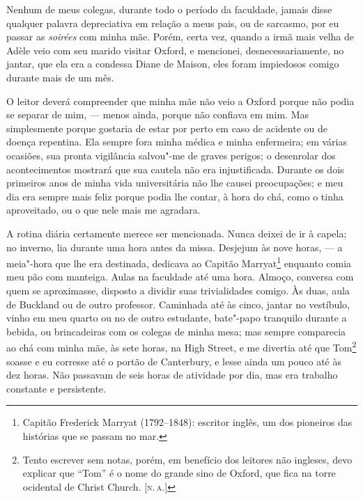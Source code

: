 Nenhum de meus colegas, durante todo o período da faculdade, jamais
disse qualquer palavra depreciativa em relação a meus pais, ou de
sarcasmo, por eu passar as \textit{soirées} com minha mãe. Porém, certa
vez, quando a irmã mais velha de Adèle veio com seu marido visitar
Oxford, e mencionei, desnecessariamente, no jantar, que ela era a
condessa Diane de Maison, eles foram impiedosos comigo durante mais de
um mês.

O leitor deverá compreender que minha mãe não veio a Oxford porque não
podia se separar de mim, --- menos ainda, porque não confiava em mim. Mas
simplesmente porque gostaria de estar por perto em caso de acidente ou
de doença repentina. Ela sempre fora minha médica e minha enfermeira; em
várias ocasiões, sua pronta vigilância salvou"-me de graves perigos; o
desenrolar dos acontecimentos mostrará que sua cautela não era
injustificada. Durante os dois primeiros anos de minha vida
universitária não lhe causei preocupações; e meu dia era sempre mais
feliz porque podia lhe contar, à hora do chá, como o tinha aproveitado,
ou o que nele mais me agradara.

A rotina diária certamente merece ser mencionada. Nunca deixei de
ir à capela; no inverno, lia durante uma hora antes da missa. Desjejum
às nove horas, --- a meia"-hora que lhe era destinada, dedicava ao Capitão
Marryat\footnote{Capitão Frederick Marryat (1792--1848): escritor inglês,
  um dos pioneiros das histórias que se passam no mar.}
enquanto comia meu pão com manteiga. Aulas na faculdade até uma hora.
Almoço, conversa com quem se aproximasse, disposto a dividir suas
trivialidades comigo. Às duas, aula de Buckland ou de outro professor.
Caminhada até às cinco, jantar no vestíbulo, vinho em meu quarto ou no
de outro estudante, bate"-papo tranquilo durante a bebida, ou
brincadeiras com os colegas de minha mesa; mas sempre comparecia ao chá
com minha mãe, às sete horas, na High Street, e me divertia até que
Tom\footnote{Tento escrever sem notas, porém, em benefício dos leitores
  não ingleses, devo explicar que ``Tom'' é o nome do grande sino de
  Oxford, que fica na torre ocidental de Christ Church. {[}\textsc{n.\,a.}{]}}
soasse e eu corresse até o portão de Canterbury, e lesse ainda um pouco
até às dez horas. Não passavam de seis horas de atividade por dia, mas
era trabalho constante e persistente.


